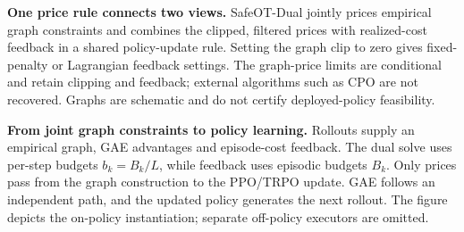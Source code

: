 \textbf{One price rule connects two views.} SafeOT-Dual jointly prices empirical
graph constraints and combines the clipped, filtered prices with realized-cost
feedback in a shared policy-update rule. Setting the graph clip to zero gives
fixed-penalty or Lagrangian feedback settings. The graph-price limits are conditional
and retain clipping and feedback; external algorithms such as CPO are not recovered.
Graphs are schematic and do not certify deployed-policy feasibility.

\textbf{From joint graph constraints to policy learning.} Rollouts supply an
empirical graph, GAE advantages and episode-cost feedback. The dual solve uses
per-step budgets $b_k=B_k/L$, while feedback uses episodic budgets $B_k$. Only
prices pass from the graph construction to the PPO/TRPO update. GAE follows an
independent path, and the updated policy generates the next rollout. The figure
depicts the on-policy instantiation; separate off-policy executors are omitted.
